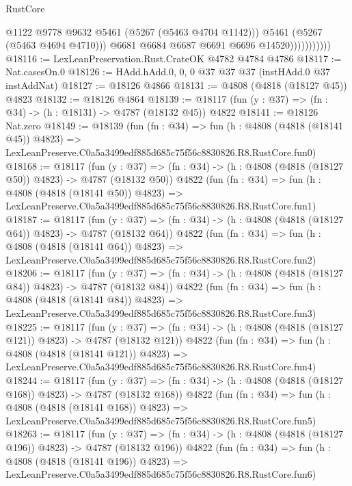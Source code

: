 \begin{lexlean}{RustCore}
\begin{coremodule}
                              @1122
                              @9778
                              @9632
                              @5461
                              (@5267 (@5463 @4704 @1142)))
                            @5461
                            (@5267 (@5463 @4694 @4710)))
                          @6681
                          @6684
                          @6687
                          @6691
                          @6696
                          @14520)))))))))))
@18116 := LexLeanPreservation.Rust.CrateOK @4782 @4784 @4786
@18117 := Nat.casesOn.{0}
@18126 := HAdd.hAdd.{0, 0, 0} @37 @37 @37 (instHAdd.{0} @37 instAddNat)
@18127 := @18126 @4866
@18131 := @4808 (@4818 (@18127 @45)) @4823
@18132 := @18126 @4864
@18139 := @18117 (fun (y : @37) => (fn : @34) -> (h : @18131) -> @4787 (@18132 @45)) @4822
@18141 := @18126 Nat.zero
@18149 := @18139
    (fun (fn : @34) =>
    fun (h : @4808 (@4818 (@18141 @45)) @4823) =>
    LexLeanPreserve.C0a5a3499edf885d685c75f56c8830826.R8.RustCore.fun0)
@18168 := @18117
    (fun (y : @37) => (fn : @34) -> (h : @4808 (@4818 (@18127 @50)) @4823) -> @4787 (@18132 @50))
    @4822
    (fun (fn : @34) =>
    fun (h : @4808 (@4818 (@18141 @50)) @4823) =>
    LexLeanPreserve.C0a5a3499edf885d685c75f56c8830826.R8.RustCore.fun1)
@18187 := @18117
    (fun (y : @37) => (fn : @34) -> (h : @4808 (@4818 (@18127 @64)) @4823) -> @4787 (@18132 @64))
    @4822
    (fun (fn : @34) =>
    fun (h : @4808 (@4818 (@18141 @64)) @4823) =>
    LexLeanPreserve.C0a5a3499edf885d685c75f56c8830826.R8.RustCore.fun2)
@18206 := @18117
    (fun (y : @37) => (fn : @34) -> (h : @4808 (@4818 (@18127 @84)) @4823) -> @4787 (@18132 @84))
    @4822
    (fun (fn : @34) =>
    fun (h : @4808 (@4818 (@18141 @84)) @4823) =>
    LexLeanPreserve.C0a5a3499edf885d685c75f56c8830826.R8.RustCore.fun3)
@18225 := @18117
    (fun (y : @37) => (fn : @34) -> (h : @4808 (@4818 (@18127 @121)) @4823) -> @4787 (@18132 @121))
    @4822
    (fun (fn : @34) =>
    fun (h : @4808 (@4818 (@18141 @121)) @4823) =>
    LexLeanPreserve.C0a5a3499edf885d685c75f56c8830826.R8.RustCore.fun4)
@18244 := @18117
    (fun (y : @37) => (fn : @34) -> (h : @4808 (@4818 (@18127 @168)) @4823) -> @4787 (@18132 @168))
    @4822
    (fun (fn : @34) =>
    fun (h : @4808 (@4818 (@18141 @168)) @4823) =>
    LexLeanPreserve.C0a5a3499edf885d685c75f56c8830826.R8.RustCore.fun5)
@18263 := @18117
    (fun (y : @37) => (fn : @34) -> (h : @4808 (@4818 (@18127 @196)) @4823) -> @4787 (@18132 @196))
    @4822
    (fun (fn : @34) =>
    fun (h : @4808 (@4818 (@18141 @196)) @4823) =>
    LexLeanPreserve.C0a5a3499edf885d685c75f56c8830826.R8.RustCore.fun6)

\end{coremodule}
\end{lexlean}
